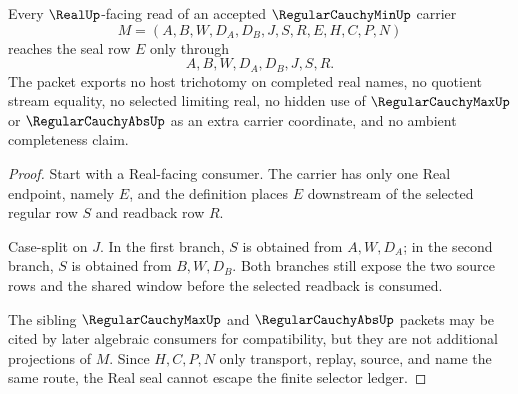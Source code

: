 \begin{theorem}
\label{thm:regular-cauchy-min-real-seal-nonescape}
Every $\RealUp$-facing read of an accepted $\RegularCauchyMinUp$ carrier
$$
M=(A,B,W,D_A,D_B,J,S,R,E,H,C,P,N)
$$
reaches the seal row $E$ only through
$$
A,B,W,D_A,D_B,J,S,R .
$$
The packet exports no host trichotomy on completed real names, no quotient stream equality, no selected limiting real, no hidden use of $\RegularCauchyMaxUp$ or $\RegularCauchyAbsUp$ as an extra carrier coordinate, and no ambient completeness claim.
\end{theorem}
\begin{proof}
Start with a Real-facing consumer. The carrier has only one Real endpoint, namely $E$, and the definition places $E$ downstream of the selected regular row $S$ and readback row $R$.

Case-split on $J$. In the first branch, $S$ is obtained from $A,W,D_A$; in the second branch, $S$ is obtained from $B,W,D_B$. Both branches still expose the two source rows and the shared window before the selected readback is consumed.

The sibling $\RegularCauchyMaxUp$ and $\RegularCauchyAbsUp$ packets may be cited by later algebraic consumers for compatibility, but they are not additional projections of $M$. Since $H,C,P,N$ only transport, replay, source, and name the same route, the Real seal cannot escape the finite selector ledger.
\end{proof}

